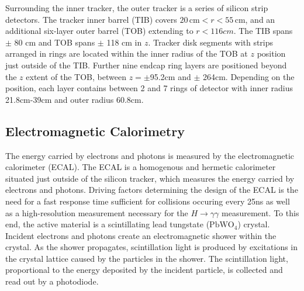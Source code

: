 
Surrounding the inner tracker, the outer tracker is a series of silicon strip detectors. The tracker inner barrel (TIB) covers $20 \,\mathrm{cm} < r < 55 \,\mathrm{cm}$, and an additional six-layer outer barrel (TOB) extending to $r<116cm$.  The TIB spans $\pm$ 80 cm and TOB spans $\pm$ 118 cm in $z$. 
Tracker disk segments with strips arranged in rings are located within the inner radius of the TOB at $z$ position just outside of the TIB. Further nine endcap ring layers are positioned beyond the $z$ extent of the TOB, between $z=\pm$95.2cm and $\pm$ 264cm. Depending on the position, each layer contains between 2 and 7 rings of detector with inner radius 21.8cm-39cm and outer radius 60.8cm.




\subsection{Electromagnetic Calorimetry}\label{ch:cms:ecal}
The energy carried by electrons and photons is measured by the electromagnetic calorimeter (ECAL). The ECAL is a homogenous and hermetic calorimeter situated just outside of the silicon tracker, which measures the energy carried by electrons and photons.
Driving factors determining the design of the ECAL is the need for a fast response time sufficient for collisions occuring every 25ns as well as a high-resolution measurement necessary for the $H\rightarrow \gamma \gamma$ measurement. To this end, the active material is a scintillating lead tungstate ($\mathrm{PbWO_4}$) crystal. Incident electrons and photons create an electromagnetic shower within the crystal. As the shower propagates, scintillation light is produced by excitations in the crystal lattice caused by the particles in the shower. The scintillation light, proportional to the energy deposited by the incident particle, is collected and read out by a photodiode\cite{CERN-LHCC-97-033}.



